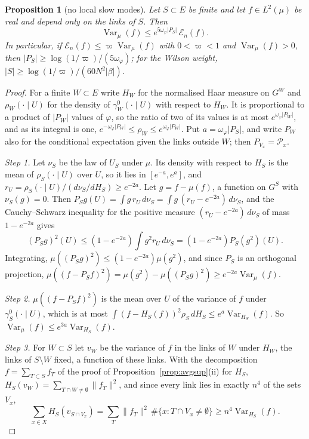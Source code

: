 \documentclass[aps,prd,twocolumn,superscriptaddress,nofootinbib,longbibliography,floatfix,amsmath,amssymb,10pt]{revtex4-2}
\newtheorem{proposition}[theorem]{Proposition}
\theoremstyle{definition}
\theoremstyle{remark}
\newcommand{\Var}{\operatorname{Var}}
\begin{document}
\begin{proposition}[no local slow modes]\label{prop:bpnoloc}
Let $S\subset E$ be finite and let $f\in L^2(\mu)$ be real and depend only on
the links of $S$. Then
\[
\Var_\mu(f)\le e^{5\omega_\varphi\lvert P_S\rvert}\,\mathcal E_n(f).
\]
In particular, if $\mathcal E_n(f)\le\varpi\Var_\mu(f)$ with $0<\varpi<1$ and
$\Var_\mu(f)>0$, then $\lvert P_S\rvert\ge\log(1/\varpi)/(5\omega_\varphi)$;
for the Wilson weight, $\lvert S\rvert\ge\log(1/\varpi)/(60N^2\lvert\beta
\rvert)$.
\end{proposition}

\begin{proof}
For a finite $W\subset E$ write $H_W$ for the normalised Haar measure on
$G^W$ and $\rho_W(\cdot\mid U)$ for the density of $\gamma^0_W(\cdot\mid U)$
with respect to $H_W$. It is proportional to a product of $\lvert P_W\rvert$
values of $\varphi$, so the ratio of two of its values is at most $e^{
\omega_\varphi\lvert P_W\rvert}$, and as its integral is one,
$e^{-\omega_\varphi\lvert P_W\rvert}\le\rho_W\le e^{\omega_\varphi\lvert
P_W\rvert}$. Put $a=\omega_\varphi\lvert P_S\rvert$, and write $P_W$ also for
the conditional expectation given the links outside $W$; then $P_{V_x}=
\mathcal P_x$.

\emph{Step 1.} Let $\nu_S$ be the law of $U_S$ under $\mu$. Its density with
respect to $H_S$ is the mean of $\rho_S(\cdot\mid U)$ over $U$, so it lies in
$[e^{-a},e^a]$, and $r_U=\rho_S(\cdot\mid U)/(d\nu_S/dH_S)\ge e^{-2a}$. Let
$g=f-\mu(f)$, a function on $G^S$ with $\nu_S(g)=0$. Then $P_Sg(U)=\int g\,
r_U\,d\nu_S=\int g\,(r_U-e^{-2a})\,d\nu_S$, and the Cauchy--Schwarz
inequality for the positive measure $(r_U-e^{-2a})\,d\nu_S$ of mass
$1-e^{-2a}$ gives
\[
(P_Sg)^2(U)\le(1-e^{-2a})\int g^2r_U\,d\nu_S=(1-e^{-2a})P_S(g^2)(U).
\]
Integrating, $\mu((P_Sg)^2)\le(1-e^{-2a})\mu(g^2)$, and since $P_S$ is an
orthogonal projection, $\mu((f-P_Sf)^2)=\mu(g^2)-\mu((P_Sg)^2)\ge e^{-2a}
\Var_\mu(f)$.

\emph{Step 2.} $\mu((f-P_Sf)^2)$ is the mean over $U$ of the variance of $f$
under $\gamma^0_S(\cdot\mid U)$, which is at most $\int(f-H_S(f))^2\rho_S\,
dH_S\le e^a\Var_{H_S}(f)$. So $\Var_\mu(f)\le e^{3a}\Var_{H_S}(f)$.

\emph{Step 3.} For $W\subset S$ let $v_W$ be the variance of $f$ in the
links of $W$ under $H_W$, the links of $S\setminus W$ fixed, a function of
these links. With the decomposition $f=\sum_{T\subset S}f_T$ of the proof of
Proposition~\ref{prop:avgsup}(ii) for $H_S$, $H_S(v_W)=\sum_{T\cap W\ne
\emptyset}\lVert f_T\rVert^2$, and since every link lies in exactly $n^4$ of
the sets $V_x$,
\[
\sum_{x\in X}H_S(v_{S\cap V_x})=\sum_T\lVert f_T\rVert^2\,\#\{x:T\cap V_x
\ne\emptyset\}\ge n^4\Var_{H_S}(f).
\]


\end{proof}
\end{document}
